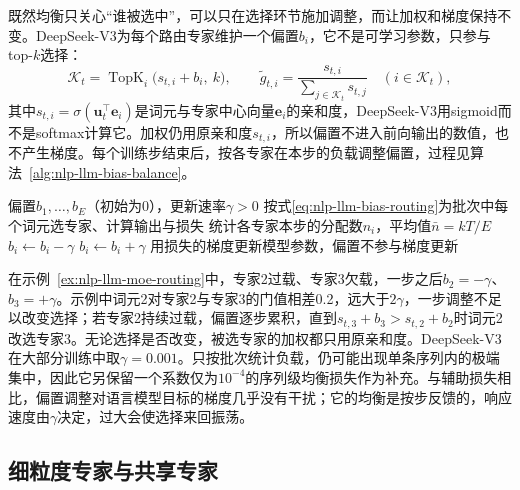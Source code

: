 既然均衡只关心“谁被选中”，可以只在选择环节施加调整，而让加权和梯度保持不变。DeepSeek-V3为每个路由专家维护一个偏置$b_i$，它不是可学习参数，只参与top-$k$选择：
\begin{equation}
 \mathcal K_t=\operatorname{TopK}_{i}\bigl(s_{t,i}+b_i,\ k\bigr),\qquad
 \tilde g_{t,i}=\frac{s_{t,i}}{\sum_{j\in\mathcal K_t}s_{t,j}}\quad(i\in\mathcal K_t),
 \label{eq:nlp-llm-bias-routing}
\end{equation}
其中$s_{t,i}=\sigma(\bm u_t^{\top}\bm e_i)$是词元与专家中心向量$\bm e_i$的亲和度，DeepSeek-V3用sigmoid而不是softmax计算它。加权仍用原亲和度$s_{t,i}$，所以偏置不进入前向输出的数值，也不产生梯度。每个训练步结束后，按各专家在本步的负载调整偏置，过程见算法~\ref{alg:nlp-llm-bias-balance}。

\begin{algorithm}[无辅助损失的负载均衡]
  \label{alg:nlp-llm-bias-balance}
  \begin{algorithmic}[1]
    \Require 偏置$b_1,\ldots,b_E$（初始为0），更新速率$\gamma>0$
      \State 按式\eqref{eq:nlp-llm-bias-routing}为批次中每个词元选专家、计算输出与损失
      \State 统计各专家本步的分配数$n_i$，平均值$\bar n=kT/E$
         \State $b_i\gets b_i-\gamma$ 
         \State $b_i\gets b_i+\gamma$ 
        \EndIf
      \EndFor
      \State 用损失的梯度更新模型参数，偏置不参与梯度更新
    \EndFor
  \end{algorithmic}
\end{algorithm}

在示例~\ref{ex:nlp-llm-moe-routing}中，专家2过载、专家3欠载，一步之后$b_2=-\gamma$、$b_3=+\gamma$。示例中词元2对专家2与专家3的门值相差0.2，远大于$2\gamma$，一步调整不足以改变选择；若专家2持续过载，偏置逐步累积，直到$s_{t,3}+b_3>s_{t,2}+b_2$时词元2改选专家3。无论选择是否改变，被选专家的加权都只用原亲和度。DeepSeek-V3在大部分训练中取$\gamma=0.001$。只按批次统计负载，仍可能出现单条序列内的极端集中，因此它另保留一个系数仅为$10^{-4}$的序列级均衡损失作为补充。与辅助损失相比，偏置调整对语言模型目标的梯度几乎没有干扰；它的均衡是按步反馈的，响应速度由$\gamma$决定，过大会使选择来回振荡。

\subsection{细粒度专家与共享专家}
\label{sec:nlp-llm-fine-grained-experts}

